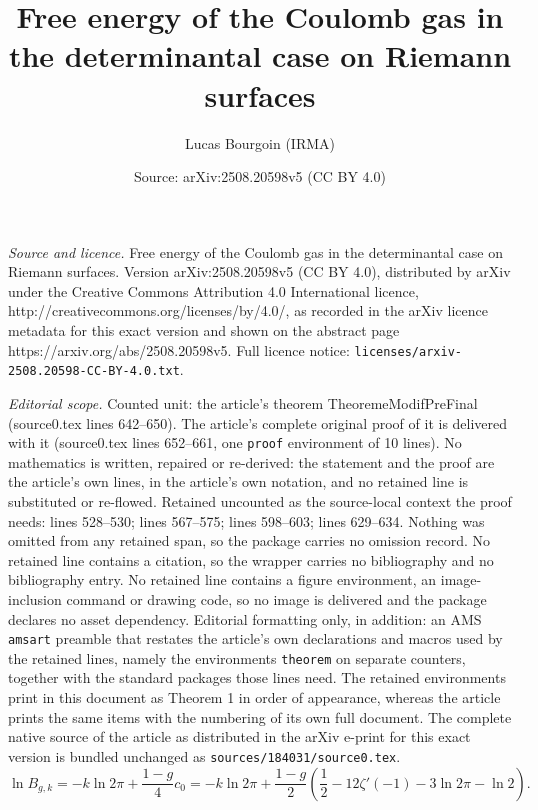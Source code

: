 \documentclass[10pt,a4paper]{amsart}
\title{Free energy of the Coulomb gas in the determinantal case on Riemann surfaces}
\author{Lucas Bourgoin (IRMA)}
\date{Source: arXiv:2508.20598v5 (CC BY 4.0)}
\begin{document}
\maketitle

\noindent\emph{Source and licence.} Free energy of the Coulomb gas in the determinantal case on Riemann surfaces. Version arXiv:2508.20598v5 (CC BY 4.0), distributed by arXiv under the Creative Commons Attribution 4.0 International licence, http://creativecommons.org/licenses/by/4.0/, as recorded in the arXiv licence metadata for this exact version and shown on the abstract page https://arxiv.org/abs/2508.20598v5. Full licence notice: \texttt{licenses/arxiv-2508.20598-CC-BY-4.0.txt}.\par\smallskip

\noindent\textit{Editorial scope.} Counted unit: the article's theorem TheoremeModifPreFinal (source0.tex lines 642--650). The article's complete original proof of it is delivered with it (source0.tex lines 652--661, one \texttt{proof} environment of 10 lines). No mathematics is written, repaired or re-derived: the statement and the proof are the article's own lines, in the article's own notation, and no retained line is substituted or re-flowed.  Retained uncounted as the source-local context the proof needs: lines 528--530; lines 567--575; lines 598--603; lines 629--634.  Nothing was omitted from any retained span, so the package carries no omission record.  No retained line contains a citation, so the wrapper carries no bibliography and no bibliography entry.  No retained line contains a figure environment, an image-inclusion command or drawing code, so no image is delivered and the package declares no asset dependency.  Editorial formatting only, in addition: an AMS \texttt{amsart} preamble that restates the article's own declarations and macros used by the retained lines, namely the environments \texttt{theorem} on separate counters, together with the standard packages those lines need.  The retained environments print in this document as Theorem 1 in order of appearance, whereas the article prints the same items with the numbering of its own full document.  The complete native source of the article as distributed in the arXiv e-print for this exact version is bundled unchanged as \texttt{sources/184031/source0.tex}.
     \begin{equation}\label{lnBgk}
         \ln B_{g,k}=-k\ln2\pi+\frac{1-g}{4}c_{0}=-k\ln2\pi +\frac{1-g}{2} \left(\frac{1}{2}-12\zeta'(-1)-3\ln2\pi-\ln2 \right).
         \end{equation}
\end{document}
